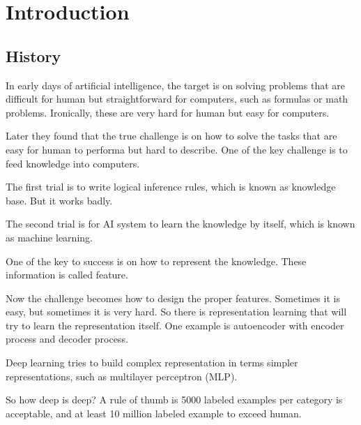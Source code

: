 \section{Introduction}

\subsection{History}

In early days of artificial intelligence, the target is on solving problems that are difficult for human but straightforward for computers, such as formulas or math problems. Ironically, these are very hard for human but easy for computers.

Later they found that the true challenge is on how to solve the tasks that are easy for human to performa but hard to describe. One of the key challenge is to feed knowledge into computers.

The first trial is to write logical inference rules, which is known as knowledge base. But it works badly.

The second trial is for AI system to learn the knowledge by itself, which is known as machine learning.

One of the key to success is on how to represent the knowledge. These information is called feature.

Now the challenge becomes how to design the proper features. Sometimes it is easy, but sometimes it is very hard. So there is representation learning that will try to learn the representation itself. One example is autoencoder with encoder process and decoder process.

Deep learning tries to build complex representation in terms simpler representations, such as multilayer perceptron (MLP).

So how deep is deep? A rule of thumb is 5000 labeled examples per category is acceptable, and at least 10 million labeled example to exceed human.





























